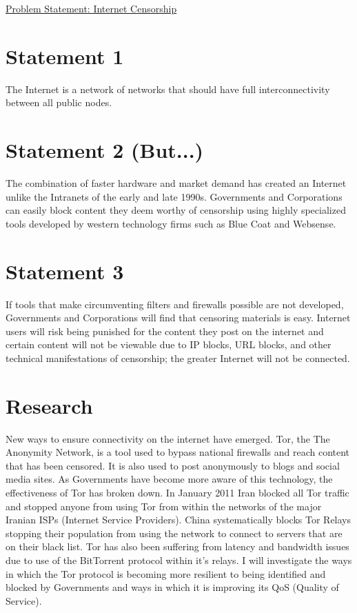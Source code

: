 \documentclass[12pt]{article}
\def\title{Problem Statement: Internet Censorship}
\begin{document}
\underline{
\large{\title}
}

\section{Statement 1}
The Internet is a network of networks that should have full interconnectivity between all public
nodes.

\section{Statement 2 (But...)}
The combination of faster hardware and market demand has created an Internet unlike the Intranets of
the early and late 1990s. Governments and Corporations can easily block content they deem worthy of
censorship using highly specialized tools developed by western technology firms such as Blue Coat
and Websense.

\section{Statement 3}
If tools that make circumventing filters and firewalls possible are not developed, Governments and
Corporations will find that censoring materials is easy. Internet users will risk being punished for
the content they post on the internet and certain content will not be viewable due to IP blocks, URL
blocks, and other technical manifestations of censorship; the greater Internet will not be connected.

\section{Research}
New ways to ensure connectivity on the internet have emerged. Tor, the The Anonymity Network, is a
tool used to bypass national firewalls and reach content that has been censored. It is also used to post
anonymously to blogs and social media sites. As Governments have become more aware of this technology, the
effectiveness of Tor has broken down. In January 2011 Iran blocked all Tor traffic and stopped
anyone from using Tor from within the networks of the major Iranian ISPs (Internet Service
Providers). China systematically blocks Tor Relays stopping their population from using the network
to connect to servers that are on their black list. Tor has also been suffering from latency and
bandwidth issues due to use of the BitTorrent protocol within it's relays. I will investigate the
ways in which the Tor protocol is becoming more resilient to being identified and blocked by
Governments and ways in which it is improving its QoS (Quality of Service).
\end{document}
